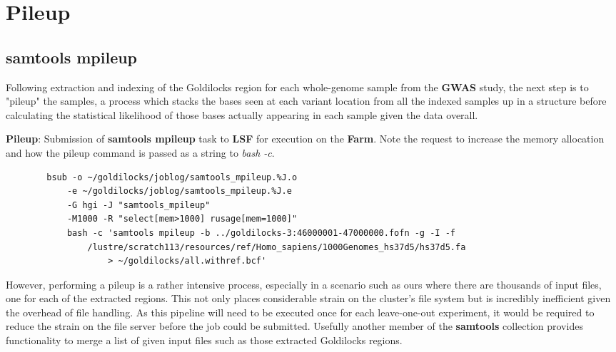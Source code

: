 \section{Pileup}
\subsection{samtools mpileup}

Following extraction and indexing of the Goldilocks region for each whole-genome
sample from the \textbf{GWAS} study, the next step is to "pileup" the samples,
a process which stacks the bases seen at each variant location from all the
indexed samples up in a structure before calculating the statistical likelihood
of those bases actually appearing in each sample given the data overall.

\begin{listing}[H]
    \caption[syn-mpileup]{\textbf{Pileup}: Submission of
        \textbf{samtools mpileup}\citep{samtools-mpileup} task to \textbf{LSF}
        for execution on the \textbf{Farm}. Note the request to increase the
        memory allocation and how the pileup command is passed as a string to
        \textit{bash -c}.}
    \label{list:syn-mpileup}
    \begin{verbatim}
        bsub -o ~/goldilocks/joblog/samtools_mpileup.%J.o
            -e ~/goldilocks/joblog/samtools_mpileup.%J.e
            -G hgi -J "samtools_mpileup"
            -M1000 -R "select[mem>1000] rusage[mem=1000]"
            bash -c 'samtools mpileup -b ../goldilocks-3:46000001-47000000.fofn -g -I -f
                /lustre/scratch113/resources/ref/Homo_sapiens/1000Genomes_hs37d5/hs37d5.fa
                    > ~/goldilocks/all.withref.bcf'
    \end{verbatim}
\end{listing}

However, performing a pileup is a rather intensive process, especially in a
scenario such as ours where there are thousands of input files, one for each of
the extracted regions. This not only places considerable strain on the cluster's
file system but is incredibly inefficient given the overhead of file handling.
As this pipeline will need to be executed once for each leave-one-out
experiment, it would be required to reduce the strain on the file server before
the job could be submitted. Usefully another member of the \textbf{samtools}
collection provides functionality to merge a list of given input files such as
those extracted Goldilocks regions.


